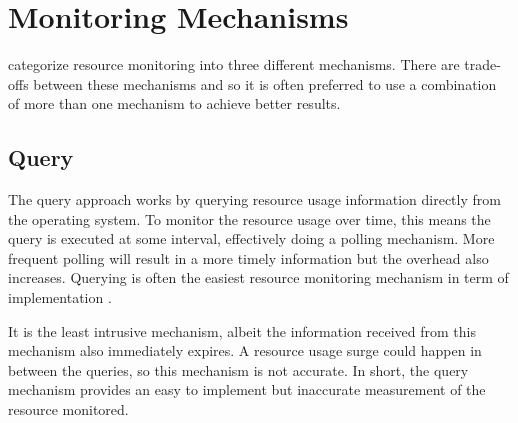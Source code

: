 \section{Monitoring Mechanisms}
\label{sec:resource.mechanisms}

\citet{juvePracticalResourceMonitoring2015} categorize resource monitoring into three different mechanisms.
There are trade-offs between these mechanisms and so it is often preferred to use a combination of more than one mechanism to achieve better results.

\subsection{Query}

The query approach works by querying resource usage information directly from the operating system.
To monitor the resource usage over time, this means the query is executed at some interval, effectively doing a polling mechanism.
More frequent polling will result in a more timely information but the overhead also increases.
Querying is often the easiest resource monitoring mechanism in term of implementation \citep{juvePracticalResourceMonitoring2015}.

It is the least intrusive mechanism, albeit the information received from this mechanism also immediately expires.
A resource usage surge could happen in between the queries, so this mechanism is not accurate.
In short, the query mechanism provides an easy to implement but inaccurate measurement of the resource monitored.

